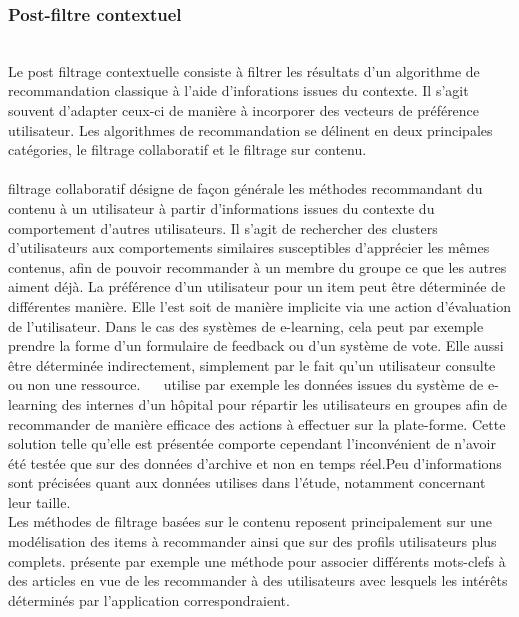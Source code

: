 \documentclass[conference]{./sty/IEEEtran}
\begin{document}
\subsubsection{Post-filtre contextuel}
~\\Le post filtrage contextuelle consiste à filtrer les résultats d'un algorithme de recommandation classique à l'aide d'inforations issues du contexte\cite{DBLP:journals/tlt/VerbertMOWDBD12}. Il s'agit souvent d'adapter ceux-ci de manière à incorporer des vecteurs de préférence utilisateur. Les algorithmes de recommandation se délinent en deux principales catégories, le filtrage collaboratif et le filtrage sur contenu.\\
~\\\Le filtrage collaboratif désigne de façon générale les méthodes recommandant du contenu à un utilisateur à partir d'informations issues du contexte du comportement d'autres utilisateurs. Il s'agit de rechercher des clusters d'utilisateurs aux comportements similaires susceptibles d'apprécier les mêmes contenus, afin de pouvoir recommander à un membre du groupe ce que les autres aiment déjà. La préférence d'un utilisateur pour un item peut être déterminée de différentes manière. Elle l'est soit de manière implicite via une action d'évaluation de l'utilisateur. Dans le cas des systèmes de e-learning, cela peut par exemple prendre la forme d'un formulaire de feedback ou d'un système de vote. Elle aussi être déterminée indirectement, simplement par le fait qu'un utilisateur consulte ou non une ressource. ~\ \cite{Liou:2014:CPL:2617848.2617854} utilise par exemple les données issues du système de  e-learning des internes d'un hôpital pour répartir les utilisateurs en groupes afin de recommander de manière efficace des actions à effectuer sur la plate-forme. Cette solution telle qu'elle est présentée comporte cependant l'inconvénient de n'avoir été testée que sur des données d'archive et non en temps réel.Peu d'informations sont précisées quant aux données utilises dans l'étude, notamment concernant leur taille. 
~\\Les méthodes de filtrage basées sur le contenu reposent principalement sur une modélisation des items à recommander ainsi que sur des profils utilisateurs plus complets. \cite{DBLP:journals/jucs/SternKHKL10} présente par exemple une méthode pour associer différents mots-clefs à des articles en vue de les recommander à des utilisateurs avec lesquels les intérêts déterminés par l'application correspondraient. 
\end{document}
